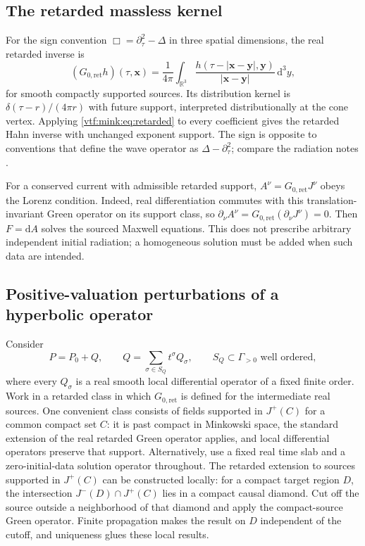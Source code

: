 \documentclass[11pt,letterpaper]{article}
\theoremstyle{definition}
\theoremstyle{remark}
\newcommand{\R}{\mathbb R}\newcommand{\C}{\mathbb C}
\newcommand{\dd}{\mathrm d}
\begin{document}
\subsection{The retarded massless kernel}
For the sign convention $\Box=\partial_\tau^2-\Delta$ in three spatial dimensions, the real retarded inverse is
\begin{equation}\label{vtf:mink:eq:retarded}
 (G_{0,\mathrm{ret}}h)(\tau,\mathbf x)
 =\frac1{4\pi}\int_{\R^3}
 \frac{h(\tau-|\mathbf x-\mathbf y|,\mathbf y)}{|\mathbf x-\mathbf y|}
 \,\dd^3y,
\end{equation}
for smooth compactly supported sources. Its distribution kernel is
$\delta(\tau-r)/(4\pi r)$ with future support, interpreted distributionally at the cone vertex. Applying \cref{vtf:mink:eq:retarded} to every coefficient gives the retarded Hahn inverse with unchanged exponent support. The sign is opposite to conventions that define the wave operator as $\Delta-\partial_\tau^2$; compare the radiation notes \cite{TongRad}.

For a conserved current with admissible retarded support, $A^\nu=G_{0,\mathrm{ret}}J^\nu$ obeys the Lorenz condition. Indeed, real differentiation commutes with this translation-invariant Green operator on its support class, so
$\partial_\nu A^\nu=G_{0,\mathrm{ret}}(\partial_\nu J^\nu)=0$.
Then $F=\dd A$ solves the sourced Maxwell equations. This does not prescribe arbitrary independent initial radiation; a homogeneous solution must be added when such data are intended.

\subsection{Positive-valuation perturbations of a hyperbolic operator}
Consider
\begin{equation}\label{vtf:mink:eq:perturbedP}
 P=P_0+Q,\qquad
 Q=\sum_{\sigma\in S_Q}t^\sigma Q_\sigma,
 \qquad S_Q\subset\Gamma_{>0}\text{ well ordered},
\end{equation}
where every $Q_\sigma$ is a real smooth local differential operator of a fixed finite order. Work in a retarded class in which $G_{0,\mathrm{ret}}$ is defined for the intermediate real sources. One convenient class consists of fields supported in $J^+(C)$ for a common compact set $C$: it is past compact in Minkowski space, the standard extension of the real retarded Green operator applies, and local differential operators preserve that support. Alternatively, use a fixed real time slab and a zero-initial-data solution operator throughout. The retarded extension to sources supported in $J^+(C)$ can be constructed locally: for a compact target region $D$, the intersection $J^-(D)\cap J^+(C)$ lies in a compact causal diamond. Cut off the source outside a neighborhood of that diamond and apply the compact-source Green operator. Finite propagation makes the result on $D$ independent of the cutoff, and uniqueness glues these local results.
\end{document}
